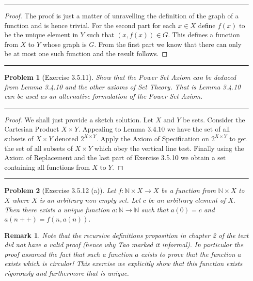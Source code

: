 \documentclass{article}
\newcommand{\lined}{\noindent\rule{\textwidth}{1pt}}
\newtheorem*{problem}{Problem}
\newtheorem*{remark}{Remark}
\begin{document}
	\lined
		\begin{proof}
			The proof is just a matter of unravelling the
			definition of the graph of a function and is hence 
			trivial. For the second part for each $x \in X$ define $f(x)$ to be the unique element in $Y$ such that
			$(x,f(x)) \in G$. This defines a function from $X$ to $Y$ whose graph is $G$. From the first part we know that there can only be at most one such function and the result follows.
		\end{proof}
	\lined
	
	\newpage
	
	\begin{problem}[Exercise 3.5.11]
		Show that the Power Set Axiom can be deduced from Lemma 3.4.10 and the other axioms of Set Theory. That is Lemma 3.4.10 can be used as an alternative formulation of the Power Set Axiom. 
	\end{problem}
	
	\lined
		\begin{proof}
			We shall just provide a sketch solution. Let $X$ and $Y$ be sets. Consider the Cartesian Product $X \times Y$. Appealing to Lemma 3.4.10 we have the set of all subsets of $X \times Y$ denoted $2^{X \times Y}$. Apply the Axiom of Specification on $2^{X \times Y}$ to get the set of all subsets of $X \times Y$ which obey the vertical line test. Finally using the Axiom of Replacement and the last part of Exercise 3.5.10 we obtain a set containing all functions from $X$ to $Y$.
		\end{proof}
	\lined
	
	\newpage
	
	\begin{problem}[Exercise 3.5.12 (a)]
		Let $f:\mathbb{N} \times X \rightarrow X$ be a function from $\mathbb{N} \times X$ to $X$ where $X$ is an arbitrary non-empty set. Let $c$ be an arbitrary element of $X$. Then there exists a unique 	function $a:\mathbb{N} \rightarrow \mathbb{N}$ such that $a(0) = c$
		and $a(n++) = f(n, a(n))$. 
	\end{problem}
	
	\begin{remark}
		Note that the recursive definitions proposition in chapter 2 of the text did not have a valid proof (hence why Tao marked it informal). In particular the proof assumed the fact that such a function $a$ exists to prove that the function $a$ exists which is circular! This exercise we explicitly show that this function exists rigorously and furthermore that is unique.
	\end{remark}
	
\end{document}
